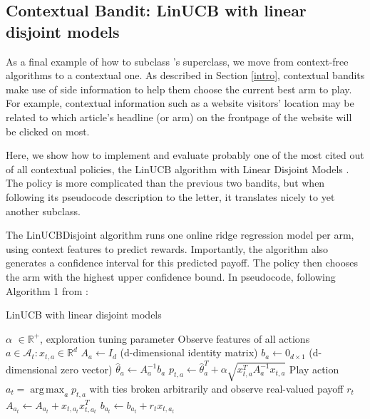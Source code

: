 \documentclass{jss}
\DeclareMathOperator*{\argmax}{arg\,max}
\begin{document}
\subsection{Contextual Bandit: LinUCB with linear disjoint models} \label{linucbc}

As a final example of how to subclass 's  superclass, we move from context-free algorithms to a contextual one. As described in Section \ref{intro}, contextual bandits make use of side information to help them choose the current best arm to play. For example, contextual information such as a website visitors' location may be related to which article's headline (or arm) on the frontpage of the website will be clicked on most.

Here, we show how to implement and evaluate probably one of the most cited out of all contextual policies, the LinUCB algorithm with Linear Disjoint Models \cite{Li2010}. The policy is more complicated than the previous two bandits, but when following its pseudocode description to the letter, it translates nicely to yet another  subclass.

The LinUCBDisjoint algorithm runs one online ridge regression model per arm, using context features to predict rewards. Importantly, the algorithm also generates a confidence interval for this predicted payoff. The policy then chooses the arm with the highest upper confidence bound. In pseudocode, following Algorithm 1 from \cite{Li2010}:

\begin{algorithm}[H]
\caption{LinUCB with linear disjoint models}
\label{Alg:LinUCBDisjoint}
\begin{algorithmic}
\REQUIRE $\alpha$ \(  \in \mathbb{R}^{+} \), exploration tuning parameter
          \STATE Observe features of all actions \(  a \in \mathcal{A}_{t}: x_{t,a} \in \mathbb{R}^{d}\)
		      \STATE \(A_{a} \leftarrow I_{d}  \)  (d-dimensional identity matrix)
		      \STATE \(b_{a} \leftarrow 0_{d\times1}   \) (d-dimensional zero vector)
		\ENDIF
		\STATE \( \hat{\theta}_{a} \leftarrow A_{a}^{-1}b_{a} \)
		\STATE \( p_{t,a} \leftarrow \hat{\theta}_{a}^{T} + \alpha  \sqrt{ x_{t,a}^{T} A_{a}^{-1}x_{t,a}} \)
	\ENDFOR
	\STATE Play action \(a_t = \argmax_a  p_{t,a}  \) with ties broken arbitrarily and observe real-valued payoff $r_t$
           \STATE \( A_{a_{t}} \leftarrow A_{a_{t}}+ x_{t,a_{t}}x_{t,a_{t}}^{T} \)
           \STATE  \( b_{a_{t}} \leftarrow b_{a_{t}}+ r_{t}x_{t,a_{t}}  \)
\ENDFOR
\end{algorithmic}
\end{algorithm}
\end{document}
